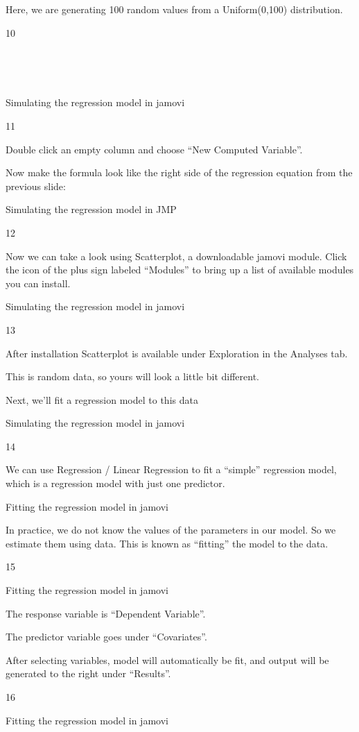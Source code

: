 \documentclass[
  letterpaper,
  DIV=11,
  numbers=noendperiod]{scrreprt}
\begin{document}
Here, we are generating 100 random values from a Uniform(0,100)
distribution.

10

~

~

Simulating the regression model in jamovi

11

Double click an empty column and choose ``New Computed Variable''.

Now make the formula look like the right side of the regression equation
from the previous slide:

Simulating the regression model in JMP

12

Now we can take a look using Scatterplot, a downloadable jamovi module.
Click the icon of the plus sign labeled ``Modules'' to bring up a list
of available modules you can install.

Simulating the regression model in jamovi

13

After installation Scatterplot is available under Exploration in the
Analyses tab.

This is random data, so yours will look a little bit different.

Next, we'll fit a regression model to this data

Simulating the regression model in jamovi

14

We can use Regression / Linear Regression to fit a ``simple'' regression
model, which is a regression model with just one predictor.

Fitting the regression model in jamovi

In practice, we do not know the values of the parameters in our model.
So we estimate them using data. This is known as ``fitting'' the model
to the data.

15

Fitting the regression model in jamovi

The response variable is ``Dependent Variable''.

The predictor variable goes under ``Covariates''.

After selecting variables, model will automatically be fit, and output
will be generated to the right under ``Results''.

16

Fitting the regression model in jamovi

~
\end{document}

